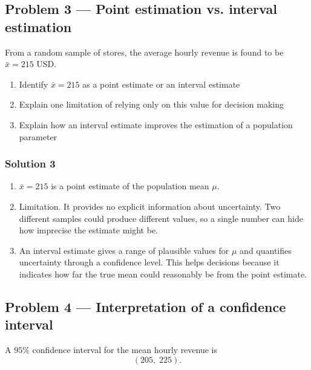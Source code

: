 
\subsection*{Problem 3 — Point estimation vs. interval estimation}

From a random sample of stores, the average hourly revenue is found to be $\bar{x} = 215$ USD.

\begin{enumerate}
	\item Identify $\bar{x} = 215$ as a point estimate or an interval estimate
	\item Explain one limitation of relying only on this value for decision making
	\item Explain how an interval estimate improves the estimation of a population parameter
\end{enumerate}

\subsubsection*{Solution 3}

\begin{enumerate}
	\item $\bar{x} = 215$ is a point estimate of the population mean $\mu$.
	\item Limitation. It provides no explicit information about uncertainty. Two different samples could produce different values, so a single number can hide how imprecise the estimate might be.
	\item An interval estimate gives a range of plausible values for $\mu$ and quantifies uncertainty through a confidence level. This helps decisions because it indicates how far the true mean could reasonably be from the point estimate.
\end{enumerate}


\subsection*{Problem 4 — Interpretation of a confidence interval}

A $95\%$ confidence interval for the mean hourly revenue is
\[
(205,\;225).
\]

